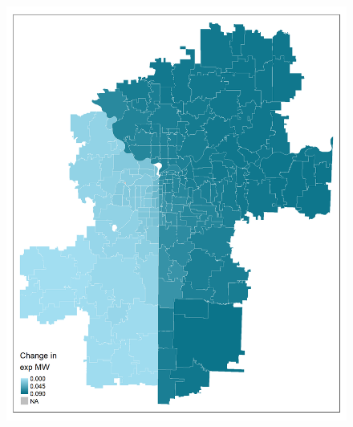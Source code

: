 \documentclass[aspectratio=169, t]{beamer}
\begin{document}
\begin{frame}[label = kc_example]
\begin{columns}
\begin{column}{0.50\textwidth}
\begin{figure}
                \includegraphics[scale = 0.36]{maps_events/output/kc2018-12_exp_mw.png}
            \end{figure}   
        \end{column}
    \end{columns}
     \hyperlink{chi_example}{}
\end{frame}
\end{document}
